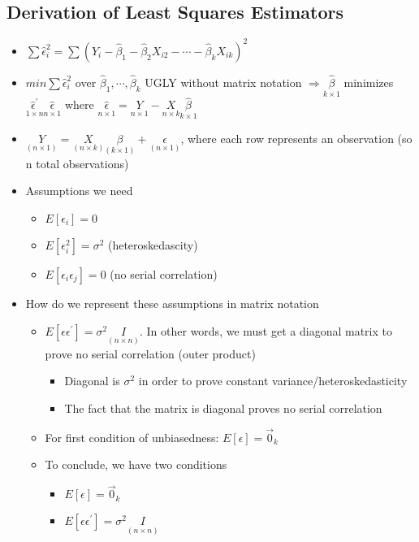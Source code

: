 \documentclass[10pt, oneside]{article}
\begin{document}
\subsection{Derivation of Least Squares Estimators}
\begin{itemize}
    \item $\sum \hat \epsilon_i ^2 = \sum(Y_i - \hat \beta_1 - \hat \beta_2 X_{i2} - \cdots - \hat \beta_k X_{ik})^2$
    \item $min \sum \hat \epsilon_i ^2$ over $\hat \beta_1 , \cdots, \hat \beta_k$ UGLY without matrix notation $\Rightarrow \underset{k\times 1}{\hat \beta} $ minimizes $\underset{1\times n}{\hat \epsilon ^\prime} \underset{n \times 1}{\hat \epsilon}$ where $\underset{n\times 1}{\hat \epsilon} = \underset{n\times 1}{Y} - \underset{n\times k}{X} \underset{k\times 1}{\hat \beta}$
    \item $\underset{(n\times 1)}{Y} = \underset{(n\times k)}{ X} \underset{(k\times 1)}{\beta} + \underset{(n\times 1)}{\epsilon}$, where each row represents an observation (so n total observations)
    \item Assumptions we need
    \begin{itemize}
        \item $E[\epsilon_i] = 0$
        \item $E[\epsilon_i^2] = \sigma^2$ (heteroskedascity)
        \item $E[\epsilon_i \epsilon_j] = 0$ (no serial correlation)
    \end{itemize}
    \item How do we represent these assumptions in matrix notation
    \begin{itemize}
        \item $E[\epsilon \epsilon^\prime] = \sigma^2 \underset{(n\times n)}{I}$. In other words, we must get a diagonal matrix to prove no serial correlation (outer product)
        \begin{itemize}
            \item Diagonal is $\sigma^2$ in order to prove constant variance/heteroskedasticity
            \item The fact that the matrix is diagonal proves no serial correlation
        \end{itemize}
        \item For first condition of unbiasedness: $E[\epsilon] = \vec 0_k$
        \item To conclude, we have two conditions
        \begin{itemize}
            \item $E[\epsilon] = \vec 0_k$
            \item $E[\epsilon \epsilon^\prime] = \sigma^2 \underset{(n\times n)}{I}$
        \end{itemize}
    \end{itemize}
\end{itemize}
\end{document}
